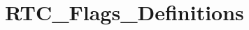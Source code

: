 \hypertarget{group___r_t_c___flags___definitions}{\section{R\-T\-C\-\_\-\-Flags\-\_\-\-Definitions}
\label{group___r_t_c___flags___definitions}
}
